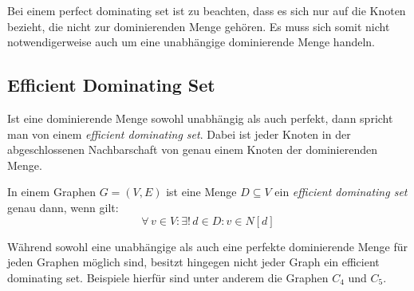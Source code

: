 Bei einem perfect dominating set ist zu beachten, dass es sich nur auf die Knoten bezieht, die nicht zur dominierenden Menge gehören. Es muss sich somit nicht notwendigerweise auch um eine unabhängige dominierende Menge handeln.

\subsection{Efficient Dominating Set}


Ist eine dominierende Menge sowohl unabhängig als auch perfekt, dann spricht man von einem \emph{efficient dominating set}. Dabei ist jeder Knoten in der abgeschlossenen Nachbarschaft von genau einem Knoten der dominierenden Menge.

\begin{mydef}
    In einem Graphen $G=(V,E)$ ist eine Menge $D \subseteq V$ ein \emph{efficient dominating set} genau dann, wenn gilt:
    \[ \forall\, v \in V: \exists!\, d \in D: v \in N[d] \]
\end{mydef}

Während sowohl eine unabhängige als auch eine perfekte dominierende Menge für jeden Graphen möglich sind, besitzt hingegen nicht jeder Graph ein efficient dominating set. Beispiele hierfür sind unter anderem die Graphen $C_4$ und $C_5$.

